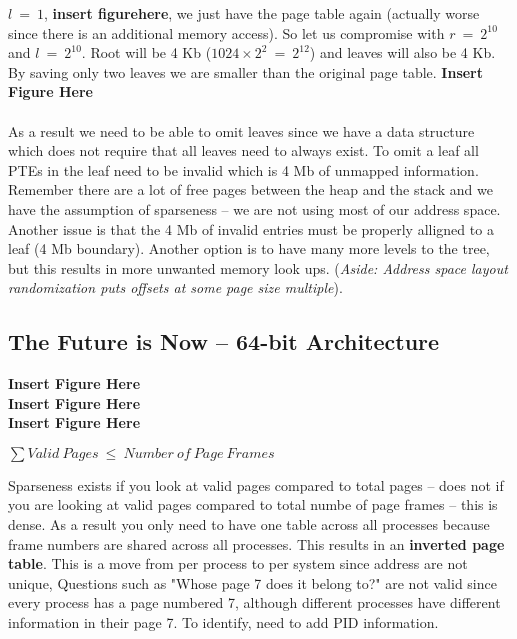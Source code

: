 \documentclass[../base_file/cs1550_notes.tex]{subfiles}
\begin{document}
$l\ =\ 1$, \textbf{insert figurehere}, we just have the page table again (actually worse since there is an additional memory
access).  So let us compromise with	$r\ =\ 2^{10}$ and $l\ =\ 2^{10}$.  Root will be 4 Kb ($1024\times 2^{2}\ =\ 2^{12}$) and
leaves will also be 4 Kb.  By saving only two leaves we are smaller than the original page table. \textbf{Insert Figure Here}\\\\
As a result we need to be able to omit leaves since we have a data structure which does not require that all leaves need to
always exist.  To omit a leaf all PTEs in the leaf need to be invalid which is 4 Mb of unmapped information. Remember there
are a lot of free pages between the heap and the stack and we have the assumption of sparseness -- we are not using most
of our address space. Another issue is that the 4 Mb of invalid entries must be properly alligned to a leaf (4 Mb boundary).
Another option is to have many more levels to the tree, but this results in more unwanted memory look ups.  (\textit{Aside:
Address space layout randomization puts offsets at some page size multiple}).
\subsection{The Future is Now -- 64-bit Architecture}
\textbf{Insert Figure Here}\\
\textbf{Insert Figure Here}\\
\textbf{Insert Figure Here}\\
\begin{center}
$\sum Valid\ Pages\ \leq\ Number\ of\ Page\ Frames$
\end{center}
Sparseness exists if you look at valid pages compared to total pages -- does not if you are looking at valid pages
compared to total numbe of page frames -- this is dense.  As a result you only need to have one table across all
processes because frame numbers are shared across all processes.  This results in an \textbf{inverted page table}.
This is a move from per process to per system since address are not unique, Questions such as "Whose page 7 does it
belong to?" are not valid since every process has a page numbered 7, although different processes have different
information in their page 7.  To identify, need to add PID information.
\end{document}

